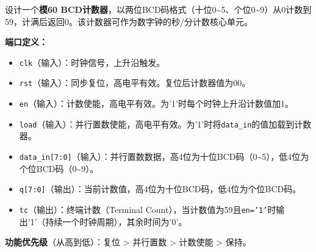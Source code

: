 设计一个\textbf{模60 BCD计数器}，以两位BCD码格式（十位0\~{}5、个位0\~{}9）从0计数到59，计满后返回0。该计数器可作为数字钟的秒/分计数核心单元。

\vspace{0.3cm}

\textbf{端口定义：}
\begin{itemize}
  \item \texttt{clk}（输入）：时钟信号，上升沿触发。
  \item \texttt{rst}（输入）：同步复位，高电平有效。复位后计数器值为00。
  \item \texttt{en}（输入）：计数使能，高电平有效。为'1'时每个时钟上升沿计数值加1。
  \item \texttt{load}（输入）：并行置数使能，高电平有效。为'1'时将\texttt{data\_in}的值加载到计数器。
  \item \texttt{data\_in[7:0]}（输入）：并行置数数据，高4位为十位BCD码（0\~{}5），低4位为个位BCD码（0\~{}9）。
  \item \texttt{q[7:0]}（输出）：当前计数值，高4位为十位BCD码，低4位为个位BCD码。
  \item \texttt{tc}（输出）：终端计数（Terminal Count），当计数值为59且\texttt{en='1'}时输出'1'（持续一个时钟周期），其余时间为'0'。
\end{itemize}

\vspace{0.3cm}

\textbf{功能优先级}（从高到低）：复位 > 并行置数 > 计数使能 > 保持。

\vspace{0.3cm}

